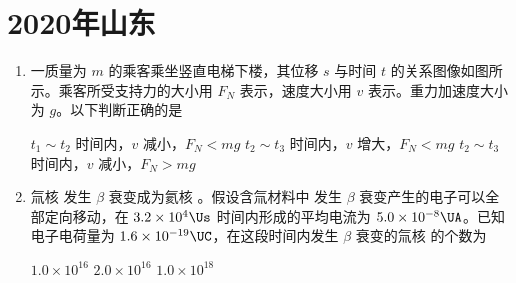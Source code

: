 \documentclass[\gkver]{gaokaozhenti}
\begin{document}
\chapter{2020年山东}

\begin{enumerate}
\item
一质量为 $m$ 的乘客乘坐竖直电梯下楼，其位移 $s$ 与时间 $t$ 的关系图像如图所示。乘客所受支持力的大小用 $F_{N}$ 表示，速度大小用 $v$ 表示。重力加速度大小为 $g$。以下判断正确的是


{$t_{1}\sim t_{2}$ 时间内，$v$ 减小，$F_{N}<mg$}
{$t_{2}\sim t_{3}$ 时间内，$v$ 增大，$F_{N}<mg$}
{$t_{2}\sim t_{3}$ 时间内，$v$ 减小，$F_{N}>mg$}


\item
氚核  发生 $\beta$ 衰变成为氦核 。假设含氚材料中  发生 $\beta$ 衰变产生的电子可以全部定向移动，在 $3.2\times10^{4}\Us$ 时间内形成的平均电流为 $5.0\times10^{-8}\UA$。已知电子电荷量为 $1.6\times10^{-19}\UC$，在这段时间内发生 $\beta$ 衰变的氚核  的个数为

{$1.0\times10^{16}$}
{$2.0\times10^{16}$}
{$1.0\times10^{18}$}

\end{enumerate}
\end{document}
